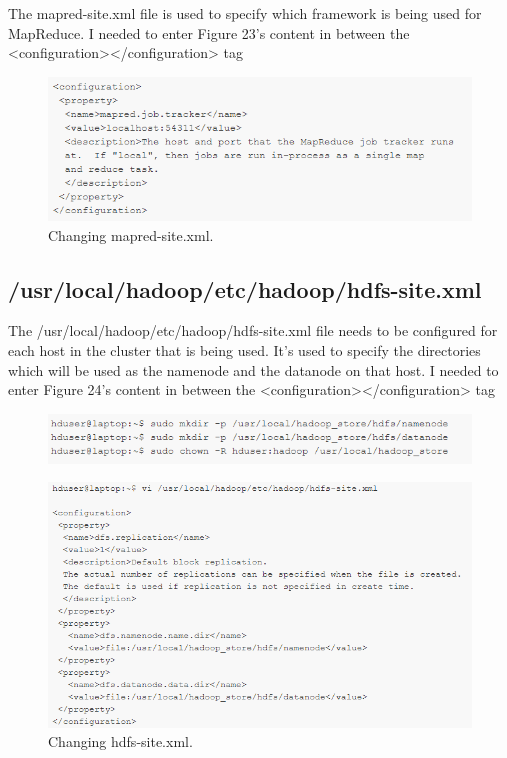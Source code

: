 \documentclass[12pt, letterpaper]{article}
\begin{document}
The mapred-site.xml file is used to specify which framework is being used for MapReduce. I needed to enter Figure 23's content in between the <configuration></configuration> tag

\begin{figure}[H]
\centering
\includegraphics[width=12cm]{RH13}
\caption{Changing mapred-site.xml.}
\label{fig:ij}
\end{figure}

\subsection{/usr/local/hadoop/etc/hadoop/hdfs-site.xml}

The /usr/local/hadoop/etc/hadoop/hdfs-site.xml file needs to be configured for each host in the cluster that is being used.  It's used to specify the directories which will be used as the namenode and the datanode on that host.  I needed to enter Figure 24's content in between the <configuration></configuration> tag

\begin{figure}[H]
\centering
\includegraphics[width=12cm]{RH14}
\label{fig:ij}
\end{figure}

\begin{figure}[H]
\centering
\includegraphics[width=12cm]{RH15}
\caption{Changing hdfs-site.xml.}
\label{fig:ij}
\end{figure}
\end{document}
